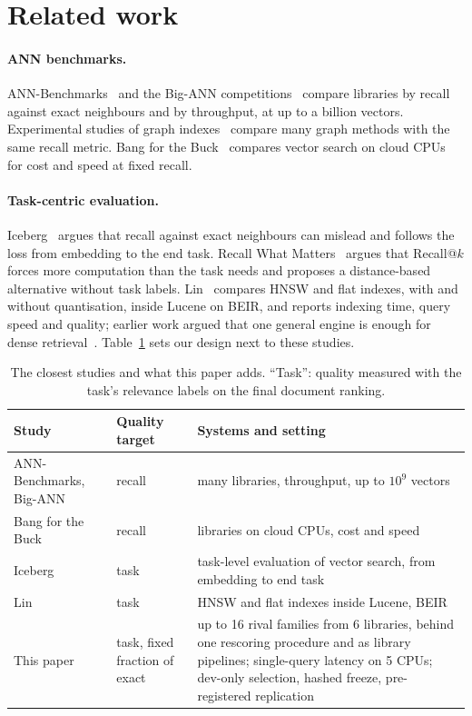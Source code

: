 \section{Related work}\label{sec:related}

\paragraph{ANN benchmarks.} ANN-Benchmarks~\cite{aumuller2020annbenchmarks} and the Big-ANN
competitions~\cite{simhadri2022bigann21,simhadri2024bigann23} compare libraries by recall against exact neighbours and
by throughput, at up to a billion vectors. Experimental studies of graph indexes~\cite{wang2021graphsurvey,azizi2025graphvector}
compare many graph methods with the same recall metric. Bang for the Buck~\cite{kuffo2025bang} compares vector search on
cloud CPUs for cost and speed at fixed recall.

\paragraph{Task-centric evaluation.} Iceberg~\cite{chen2026iceberg} argues that recall against exact neighbours can
mislead and follows the loss from embedding to the end task. Recall What Matters~\cite{dimitropoulos2026recall} argues
that Recall@$k$ forces more computation than the task needs and proposes a distance-based alternative without task
labels. Lin~\cite{lin2025operational} compares HNSW and flat indexes, with and without quantisation, inside Lucene on
BEIR, and reports indexing time, query speed and quality; earlier work argued that one general engine is enough for
dense retrieval~\cite{xian2024lucene}. Table~\ref{tab:closest} sets our design next to these studies.

\begin{table}[t]\centering\scriptsize
\caption{The closest studies and what this paper adds. ``Task'': quality measured with the task's relevance labels on the
final document ranking.}\label{tab:closest}
\begin{tabularx}{\textwidth}{p{3.1cm}p{2.3cm}X}\toprule
Study & Quality target & Systems and setting\\\midrule
ANN-Benchmarks, Big-ANN~\cite{aumuller2020annbenchmarks,simhadri2024bigann23} & recall & many libraries, throughput, up to $10^9$ vectors\\
Bang for the Buck~\cite{kuffo2025bang} & recall & libraries on cloud CPUs, cost and speed\\
Iceberg~\cite{chen2026iceberg} & task & task-level evaluation of vector search, from embedding to end task\\
Lin~\cite{lin2025operational} & task & HNSW and flat indexes inside Lucene, BEIR\\
This paper & task, fixed fraction of exact & up to 16 rival families from 6 libraries, behind one rescoring procedure and as library pipelines; single-query latency on 5 CPUs; dev-only selection, hashed freeze, pre-registered replication\\\bottomrule
\end{tabularx}
\end{table}

